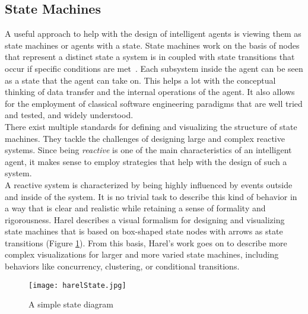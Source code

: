 \subsection{State Machines}
A useful approach to help with the design of intelligent agents is viewing them as state machines or agents with a state. State machines work on the basis of nodes that represent a distinct state a system is in coupled with state transitions that occur if specific conditions are met~\cite{Hopcroft2001}. Each subsystem inside the agent can be seen as a state that the agent can take on. This helps a lot with the conceptual thinking of data transfer and the internal operations of the agent. It also allows for the employment of classical software engineering paradigms that are well tried and tested, and widely understood.~\cite{Wooldridge2009}\\
There exist multiple standards for defining and visualizing the structure of state machines. They tackle the challenges of designing large and complex reactive systems. Since being \textit{reactive} is one of the main characteristics of an intelligent agent, it makes sense to employ strategies that help with the design of such a system.~\cite{Harel1985}\\
A reactive system is characterized by being highly influenced by events outside and inside of the system. It is no trivial task to describe this kind of behavior in a way that is clear and realistic while retaining a sense of formality and rigorousness. Harel describes a visual formalism for designing and visualizing state machines that is based on box-shaped state nodes with arrows as state transitions (Figure \ref{fig:harelState}). From this basis, Harel's work goes on to describe more complex visualizations for larger and more varied state machines, including behaviors like concurrency, clustering, or conditional transitions.~\cite{Harel1987}\\
\begin{figure}
	\centering
	\texttt{[image: harelState.jpg]}
	\caption{A simple state diagram~\cite{Harel1987}}
	\label{fig:harelState}
\end{figure}
